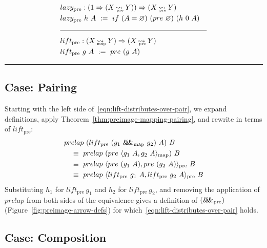 \documentclass[preprint]{sigplanconf}
\newcommand{\arrow}{\rightsquigarrow}
\newcommand{\arrowlift}{\ensuremath{lift}}
\newcommand{\arrowpair}{\ensuremath{\mathit{\&\mspace{-7.5mu}\&\mspace{-7.5mu}\&}}}
\newcommand{\arrowlazy}{\ensuremath{lazy}}
\newcommand{\map}{_\mathrm{map}}
\DeclareMathOperator{\mapto}{\arrow_{\mspace{-21mu}\map}}
\newcommand{\pairmap}{\arrowpair\map}
\newcommand{\pre}{_\mathrm{pre}}
\DeclareMathOperator{\preto}{\arrow_{\mspace{-19mu}\pre}}
\newcommand{\liftpre}{\arrowlift\pre}
\newcommand{\pairpre}{\arrowpair\pre}
\newcommand{\lazypre}{\arrowlazy\pre}
\begin{document}
\begin{figure*}
\begin{align*}
\begin{aligned}[t]
\\[-6pt]
	&\begin{aligned}[t]
		&\lazypre : (1 \tto (X \preto Y)) \tto (X \preto Y) \\
		&\lazypre~h~A \ := \ if~(A = \emptyset)~(pre~\emptyset)~(h~0~A)
	\end{aligned} \\
\\[-6pt]
\hline
\\[-6pt]
	&\begin{aligned}[t]
		&\liftpre : (X \mapto Y) \tto (X \preto Y) \\
		&\liftpre~g~A \ := \ pre~(g~A)
	\end{aligned}
\end{aligned}
\end{align*}
\hrule
\caption{Preimage arrow definitions.}
\label{fig:preimage-arrow-defs}
\end{figure*}

\subsection{Case: Pairing}

Starting with the left side of~\eqref{eqn:lift-distributes-over-pair}, we expand definitions, apply Theorem~\ref{thm:preimage-mapping-pairing}, and rewrite in terms of $\liftpre$:
\begin{align*}
	&pre!ap~(\liftpre~(g_1~\pairmap~g_2)~A)~B
\\
	&\tab \equiv \ pre!ap~(pre~\pair{g_1~A, g_2~A}\map)~B
\\
	&\tab \equiv \ pre!ap~\pair{pre~(g_1~A), pre~(g_2~A)}\pre~B
\\
	&\tab \equiv \ pre!ap~\pair{\liftpre~g_1~A, \liftpre~g_2~A}\pre~B
\end{align*}
Substituting $h_1$ for $\liftpre~g_1$ and $h_2$ for $\liftpre~g_2$, and removing the application of $pre!ap$ from both sides of the equivalence gives a definition of $(\pairpre)$ (Figure~\ref{fig:preimage-arrow-defs}) for which~\eqref{eqn:lift-distributes-over-pair} holds.

\subsection{Case: Composition}
\end{document}

